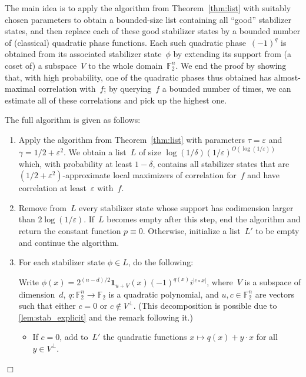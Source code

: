 \documentclass[11pt]{amsart}
\newcommand{\F}{\mathbb{F}} %
\newcommand{\one}{\mathbf{1}}
\newcommand{\eps}{\varepsilon}
\theoremstyle{plain}
\theoremstyle{definition}
\theoremstyle{remark}
\renewenvironment{proof}[1][]{
    	\begin{trivlist}
     	\item[\hspace{\labelsep}{\em\noindent Proof#1:\/}]}
     	{{\hfill$\Box$}
    	\end{trivlist}
  }
\begin{document}
\begin{proof}[ of \cref{thm:quadratic_GL}]
The main idea is to apply the algorithm from Theorem~\ref{thm:list} with suitably chosen parameters to obtain a bounded-size list containing all ``good'' stabilizer states, and then replace each of these good stabilizer states by a bounded number of (classical) quadratic phase functions.
Each such quadratic phase~$(-1)^q$ is obtained from its associated stabilizer state~$\phi$ by extending its support from (a coset of) a subspace~$V$ to the whole domain~$\F_2^n$.
We end the proof by showing that, with high probability, one of the quadratic phases thus obtained has almost-maximal correlation with~$f$;
by querying~$f$ a bounded number of times, we can estimate all of these correlations and pick up the highest one.

The full algorithm is given as follows:
\begin{enumerate}
    \item Apply the algorithm from Theorem~\ref{thm:list} with parameters $\tau = \eps$ and $\gamma = 1/2 + \eps^2$.
    We obtain a list~$L$ of size $\log(1/\delta) (1/\eps)^{O(\log(1/\eps))}$ which, with probability at least $1-\delta$, contains all stabilizer states that are $(1/2+\eps^2)$-approximate local maximizers of correlation for~$f$ and have correlation at least~$\eps$ with~$f$.
    
    \item Remove from~$L$ every stabilizer state whose support has codimension larger than $2\log(1/\eps)$.
    If~$L$ becomes empty after this step, end the algorithm and return the constant function $p \equiv 0$.
    Otherwise, initialize a list~$L'$ to be empty and continue the algorithm.
    
    \item For each stabilizer state $\phi\in L$, do the following:

    \noindent Write $\phi(x) = 2^{(n-d)/2} \one_{u+V}(x) (-1)^{q(x)} i^{|c\circ x|}$, where~$V$ is a subspace of dimension~$d$, $q: \F_2^n \to \F_2$ is a quadratic polynomial, and $u, c \in \F_2^n$ are vectors such that either $c=0$ or $c\notin V^\perp$.
    (This decomposition is possible due to \cref{lem:stab_explicit} and the remark following it.)
    \begin{itemize}
        \item[$(a)$] If $c=0$, add to~$L'$ the quadratic functions $x\mapsto q(x)+y\cdot x$ for all $y\in V^\perp$.


\end{itemize}
\end{enumerate}
\end{proof}
\end{document}
